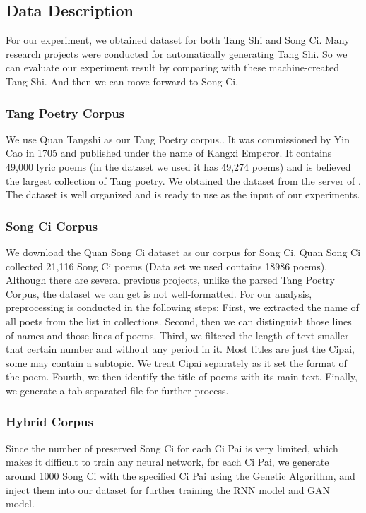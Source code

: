 \subsection{Data Description}   
For our experiment, we obtained dataset for both Tang Shi and Song Ci. Many research projects were conducted for automatically generating Tang Shi. So we can evaluate our experiment result by comparing with these machine-created Tang Shi. And then we can move forward to Song Ci.
\subsubsection{Tang Poetry Corpus}
We use Quan Tangshi as our Tang Poetry corpus.\cite{1960quantangshi}. It was commissioned by Yin Cao in 1705 and published under the name of Kangxi Emperor. It contains 49,000 lyric poems (in the dataset we used it has 49,274 poems) and is believed the largest collection of Tang poetry. We obtained the dataset from the server of \cite{zhang2014chinese}. The dataset is well organized and is ready to use as the input of our experiments.
\subsubsection{Song Ci Corpus}
We download the Quan Song Ci dataset as our corpus for Song Ci. Quan Song Ci collected 21,116 Song Ci poems (Data set we used contains 18986 poems). Although there are several previous projects, unlike the parsed Tang Poetry Corpus, the dataset we can get is not well-formatted. For our analysis, preprocessing is conducted in the following steps: First, we extracted the name of all poets from the list in collections. Second, then we can distinguish those lines of names and those lines of poems. Third, we filtered the length of text smaller that certain number and without any period in it. Most titles are just the Cipai, some may contain a subtopic. We treat Cipai separately as it set the format of the poem. Fourth, we then identify the title of poems with its main text. Finally, we generate a tab separated file for further process.
\subsubsection {Hybrid Corpus}
Since the number of preserved Song Ci for each Ci Pai is very limited, which makes it difficult to train any neural network, for each Ci Pai, we generate around 1000 Song Ci with the specified Ci Pai using the Genetic Algorithm, and inject them into our dataset for further training the RNN model and GAN model.